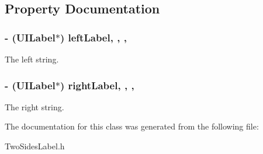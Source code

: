\subsection{Property Documentation}
\hypertarget{interface_two_sides_label_ae2c5763f3d4b956e6572efb8af215605}{
\subsubsection[{left\+Label}]{\setlength{\rightskip}{0pt plus 5cm}-\/ (U\+I\+Label$\ast$) left\+Label\hspace{0.3cm}{\ttfamily [read]}, {\ttfamily [write]}, {\ttfamily [nonatomic]}, {\ttfamily [weak]}}}\label{interface_two_sides_label_ae2c5763f3d4b956e6572efb8af215605}
The left string. \hypertarget{interface_two_sides_label_a91d247769e9ab61c90583be8048c30e7}{
\subsubsection[{right\+Label}]{\setlength{\rightskip}{0pt plus 5cm}-\/ (U\+I\+Label$\ast$) right\+Label\hspace{0.3cm}{\ttfamily [read]}, {\ttfamily [write]}, {\ttfamily [nonatomic]}, {\ttfamily [weak]}}}\label{interface_two_sides_label_a91d247769e9ab61c90583be8048c30e7}
The right string. 

The documentation for this class was generated from the following file\+:\begin{DoxyCompactItemize}
\item 
Two\+Sides\+Label.\+h\end{DoxyCompactItemize}
